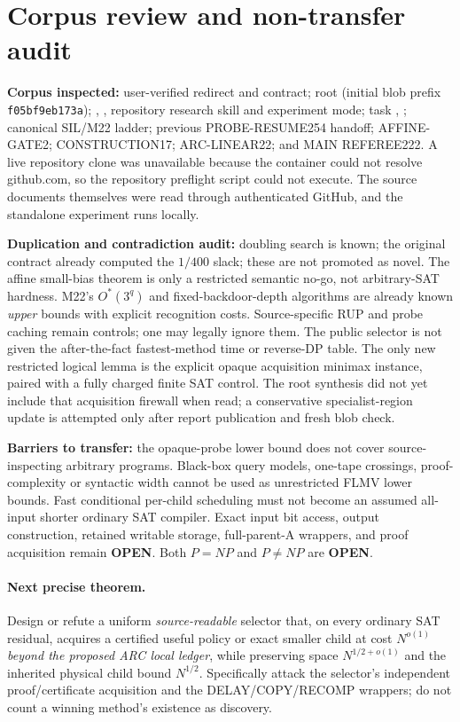 \documentclass[10pt]{article}
\newcommand{\OPEN}{\textbf{OPEN}}
\begin{document}
\section{Corpus review and non-transfer audit}
\textbf{Corpus inspected:} user-verified redirect and contract; root  (initial blob prefix \texttt{f05bf9eb173a}); , , repository research skill and experiment mode; task , ; canonical SIL/M22 ladder; previous PROBE-RESUME254 handoff; AFFINE-GATE2; CONSTRUCTION17; ARC-LINEAR22; and MAIN REFEREE222. A live repository clone was unavailable because the container could not resolve github.com, so the repository preflight script could not execute. The source documents themselves were read through authenticated GitHub, and the standalone experiment runs locally.

\textbf{Duplication and contradiction audit:} doubling search is known; the original contract already computed the $1/400$ slack; these are not promoted as novel. The affine small-bias theorem is only a restricted semantic no-go, not arbitrary-SAT hardness. M22's $O^*(3^q)$ and fixed-backdoor-depth algorithms are already known \emph{upper} bounds with explicit recognition costs. Source-specific RUP and probe caching remain controls; one may legally ignore them. The public selector is not given the after-the-fact fastest-method time or reverse-DP table. The only new restricted logical lemma is the explicit opaque acquisition minimax instance, paired with a fully charged finite SAT control. The root synthesis did not yet include that acquisition firewall when read; a conservative specialist-region update is attempted only after report publication and fresh blob check.

\textbf{Barriers to transfer:} the opaque-probe lower bound does not cover source-inspecting arbitrary programs. Black-box query models, one-tape crossings, proof-complexity or syntactic width cannot be used as unrestricted FLMV lower bounds. Fast conditional per-child scheduling must not become an assumed all-input shorter ordinary SAT compiler. Exact input bit access, output construction, retained writable storage, full-parent-A wrappers, and proof acquisition remain \OPEN. Both $P=NP$ and $P\ne NP$ are \OPEN.

\paragraph{Next precise theorem.}
Design or refute a uniform \emph{source-readable} selector that, on every ordinary SAT residual, acquires a certified useful policy or exact smaller child at cost $N^{o(1)}$ \emph{beyond the proposed ARC local ledger}, while preserving space $N^{1/2+o(1)}$ and the inherited physical child bound $N^{1/2}$. Specifically attack the selector's independent proof/certificate acquisition and the DELAY/COPY/RECOMP wrappers; do not count a winning method's existence as discovery.
\end{document}
